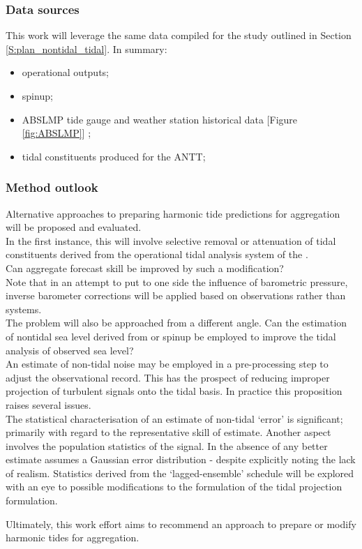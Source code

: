 \subsubsection{Data sources}

This work will leverage the same data compiled for the study outlined in Section \ref{S:plan_nontidal_tidal}.  In summary:
\begin{itemize}
\item \BL{} operational outputs;
\item \OFAM{} spinup;
\item ABSLMP tide gauge and weather station historical data [Figure \ref{fig:ABSLMP}] ;
\item tidal constituents produced for the ANTT;
\end{itemize}

\subsubsection{Method outlook}

Alternative approaches to preparing harmonic tide predictions for aggregation will be proposed and evaluated.\\


In the first instance, this will involve selective removal or attenuation of tidal constituents derived from the operational tidal analysis system of the \BOM{}.\\
Can aggregate forecast skill be improved by such a modification? \\
Note that in an attempt to put to one side the influence of barometric pressure, inverse barometer corrections will be applied based on observations rather than \NWP{} systems.\\ 



The problem will also be approached from a different angle. Can the estimation of nontidal sea level derived from \BL{} or \OFAM{} spinup be employed to improve the tidal analysis of observed sea level?\\
An estimate of non-tidal noise may be employed in a pre-processing step to adjust the observational record.  This has the prospect of reducing improper projection of turbulent signals onto the tidal basis. In practice this proposition raises several issues. \\
The statistical characterisation of an estimate of non-tidal `error' is significant; primarily with regard to the representative skill of estimate.  Another aspect involves the population statistics of the signal.  In the absence of any better estimate \citep{Foreman:2009bg} assumes a Gaussian error distribution - despite explicitly noting the lack of realism.  Statistics derived from the \BL{}  `lagged-ensemble' schedule will be explored with an eye to possible modifications to the formulation of the tidal projection formulation.




Ultimately, this work effort aims to recommend an approach to prepare or modify harmonic tides for aggregation.




